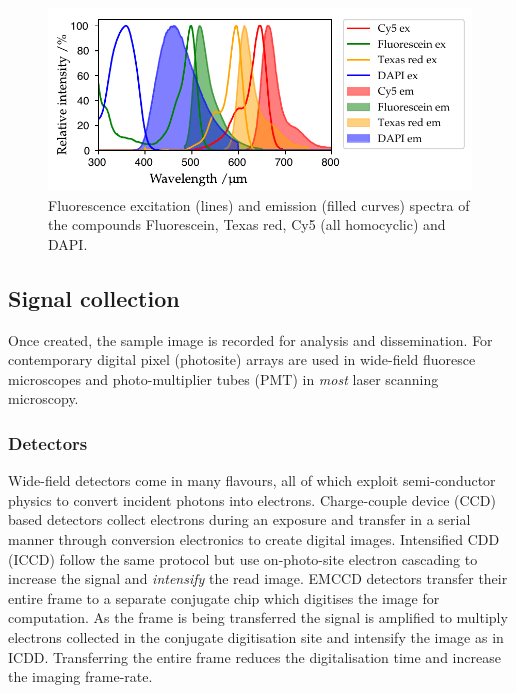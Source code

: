 \begin{figure}
    \centering
    \includegraphics{./fluorphores/++multi_plot.pdf}
    \caption{Fluorescence excitation (lines) and emission (filled curves) spectra of the compounds Fluorescein, Texas red, Cy5 (all homocyclic) and DAPI.}
    \label{fig:fluo_spectra}
\end{figure}

\subsection{Signal collection}

Once created, the sample image is recorded for analysis and dissemination.
For contemporary digital pixel (photosite) arrays are used in wide-field fluoresce microscopes and photo-multiplier tubes (PMT) in \emph{most} laser scanning microscopy.

\subsubsection{Detectors}

Wide-field detectors come in many flavours, all of which exploit semi-conductor physics to convert incident photons into electrons.
Charge-couple device (CCD) based detectors collect electrons during an exposure and transfer in a serial manner through conversion electronics to create digital images.
Intensified CDD (ICCD) follow the same protocol but use on-photo-site electron cascading to increase the signal and \emph{intensify} the read image.
EMCCD detectors transfer their entire frame to a separate conjugate chip which digitises the image for computation.
As the frame is being transferred the signal is amplified to multiply electrons collected in the conjugate digitisation site and intensify the image as in ICDD.
Transferring the entire frame reduces the digitalisation time and increase the imaging frame-rate.

